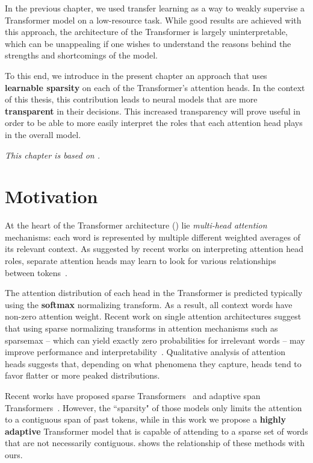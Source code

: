 \label{cap:adaptsparse}

In the previous chapter, we used transfer learning as a way
to weakly supervise a Transformer model on a low-resource task.
While good results are achieved with this approach, the
architecture of the Transformer is largely uninterpretable,
which can be unappealing if one wishes to understand the
reasons behind the strengths and shortcomings of the model.

To this end, we introduce in the present chapter an approach that
uses \textbf{learnable sparsity} on each of the Transformer's
attention heads. In the context of this thesis, this contribution
leads to neural models that are more \textbf{transparent} in their
decisions. This increased transparency will prove useful in order to
be able to more easily interpret the roles that each attention head
plays in the overall model.

\textit{This chapter is based on \citet{correia2019adaptively}.}

\section{Motivation}

At the heart of the Transformer architecture
() lie \emph{multi-head attention}
mechanisms: each word is represented by multiple different weighted
averages of its relevant context. As suggested by recent works on
interpreting attention head roles, separate attention heads may learn
to look for various relationships between
tokens~\citep{tang2018why,raganato2018analysis,
    marecek-rosa-2018-extracting,bert-rediscovers,specialized}.

The attention distribution of each head in the Transformer is
predicted typically using the \textbf{softmax} normalizing transform.
As a result, all context words have non-zero attention weight. Recent
work on single attention architectures suggest that using sparse
normalizing transforms in attention mechanisms such as sparsemax --
which can yield exactly zero probabilities for irrelevant words --
may improve performance and
interpretability~\citep{malaviya2018sparse,deng2018latent,entmax}.
Qualitative analysis of attention heads
\citep[Figure~5]{vaswani2017attention} suggests that, depending on
what phenomena they capture, heads tend to favor flatter or more
peaked distributions.

\begin{sloppypar}
    Recent works have proposed sparse
    Transformers~\citep{openai_sparse_transf} and adaptive span
    Transformers~\citep{Sukhbaatar2019}. However, the ``sparsity" of those
    models only limits the attention to a contiguous span of past tokens,
    while in this work we propose a \textbf{highly adaptive} Transformer
    model that is capable of attending to a sparse set of words that are
    not necessarily contiguous.  shows the
    relationship of these methods with ours.
\end{sloppypar}

